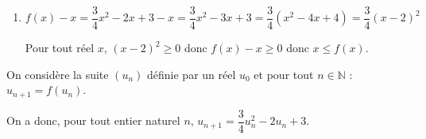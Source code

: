 \documentclass[10pt]{article}
\providecommand{\N}{\mathbb{N}}
\begin{document}
\begin{enumerate}
Or $f\left(\dfrac43\right) = \dfrac53$ et $f(2) = \dfrac34 \times 4 - 2 \times 2 + 3 = 3 - 4 + 3 = 2$.

Donc $\dfrac53 \leqslant f(x) \leqslant  2$ et \emph{a fortiori} : $\dfrac43 \leqslant f(x) \leqslant 2$.

\item




$f(x)-x = \dfrac{3}{4} x^2 -2x+3-x = \dfrac{3}{4}x^2 - 3x +3 = \dfrac{3}{4}\left ( x^2 -4x+4 \right ) = \dfrac{3}{4} \left (x-2\right )^2$ 

Pour tout réel $x$, $(x-2)^2\geqslant 0$ donc $f(x)-x \geqslant 0$ donc $x\leqslant f(x)$.
\end{enumerate}

On considère la suite $\left(u_n\right)$ définie par un réel $u_0$ et pour tout  $n\in\N$ : $u_{n+1} = f\left(u_n\right).$

On a donc, pour tout entier naturel $n$,
$u_{n+1} = \dfrac34 u_n^2 - 2u_n + 3.$
\end{document}
